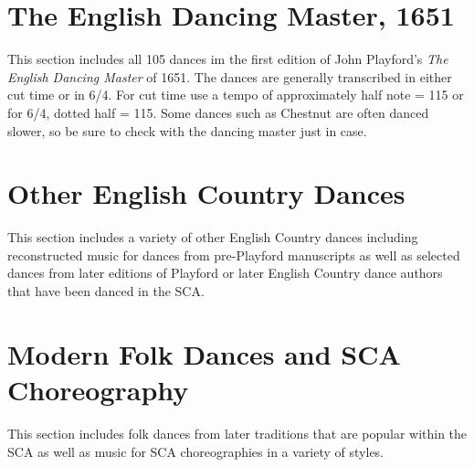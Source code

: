 \documentclass[11pt]{book}
\begin{document}

\chapter{The English Dancing Master, 1651}

This section includes all 105 dances im the first edition of John Playford's
{\em The English Dancing Master} of 1651.  The dances are generally transcribed
in either cut time or in 6/4. For cut time use a tempo of approximately half
note = 115 or for 6/4, dotted half = 115.  Some dances such as Chestnut are
often danced slower, so be sure to check with the dancing master just in case.



\chapter{Other English Country Dances}

This section includes a variety of other English Country dances including
reconstructed music for dances from pre-Playford manuscripts as well as
selected dances from later editions of Playford or later English Country dance
authors that have been danced in the SCA.



\chapter{Modern Folk Dances and SCA Choreography}

This section includes folk dances from later traditions that are popular within
the SCA as well as music for SCA choreographies in a variety of styles.



\clearpage

\printindex
\end{document}
